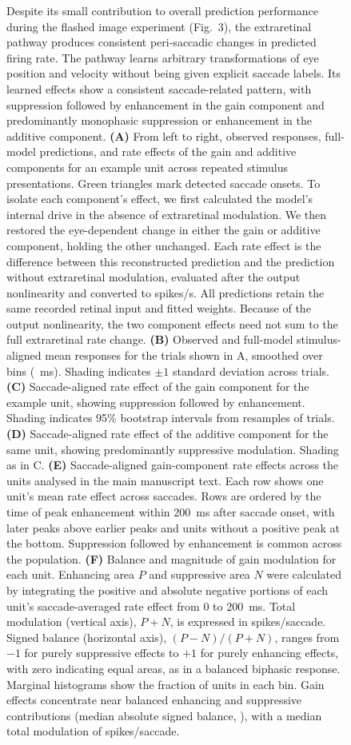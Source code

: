 \documentclass{lite}
\begin{document}
\begin{figure}[p]
  \ContinuedFloat
  \captionsetup{singlelinecheck=false}
  \caption[]{
  Despite its small contribution to overall prediction performance during the flashed image experiment (Fig.~3), the extraretinal pathway produces consistent peri-saccadic changes in predicted firing rate. The pathway learns arbitrary transformations of eye position and velocity without being given explicit saccade labels. Its learned effects show a consistent saccade-related pattern, with suppression followed by enhancement in the gain component and predominantly monophasic suppression or enhancement in the additive component.
  \textbf{(A)} From left to right, observed responses, full-model predictions, and rate effects of the gain and additive components for an example unit across \EDThreeTrials{} repeated stimulus presentations. Green triangles mark detected saccade onsets. To isolate each component's effect, we first calculated the model's internal drive in the absence of extraretinal modulation. We then restored the eye-dependent change in either the gain or additive component, holding the other unchanged. Each rate effect is the difference between this reconstructed prediction and the prediction without extraretinal modulation, evaluated after the output nonlinearity and converted to spikes/s. All predictions retain the same recorded retinal input and fitted weights. Because of the output nonlinearity, the two component effects need not sum to the full extraretinal rate change.
  \textbf{(B)} Observed and full-model stimulus-aligned mean responses for the trials shown in A, smoothed over \EDThreeSmoothingBins{} bins (\EDThreeSmoothingMs{}~ms). Shading indicates $\pm1$ standard deviation across trials.
  \textbf{(C)} Saccade-aligned rate effect of the gain component for the example unit, showing suppression followed by enhancement. Shading indicates 95\% bootstrap intervals from \EDThreeBootstrapDraws{} resamples of trials.
  \textbf{(D)} Saccade-aligned rate effect of the additive component for the same unit, showing predominantly suppressive modulation. Shading as in C.
  \textbf{(E)} Saccade-aligned gain-component rate effects across the \EDThreeUnits{} units analysed in the main manuscript text. Each row shows one unit's mean rate effect across saccades. Rows are ordered by the time of peak enhancement within 200~ms after saccade onset, with later peaks above earlier peaks and units without a positive peak at the bottom. Suppression followed by enhancement is common across the population.
  \textbf{(F)} Balance and magnitude of gain modulation for each unit. Enhancing area $P$ and suppressive area $N$ were calculated by integrating the positive and absolute negative portions of each unit's saccade-averaged rate effect from 0 to 200~ms. Total modulation (vertical axis), $P+N$, is expressed in spikes/saccade. Signed balance (horizontal axis), $(P-N)/(P+N)$, ranges from $-1$ for purely suppressive effects to $+1$ for purely enhancing effects, with zero indicating equal areas, as in a balanced biphasic response. Marginal histograms show the fraction of units in each bin. Gain effects concentrate near balanced enhancing and suppressive contributions (median absolute signed balance, \EDThreeGainBalance{}), with a median total modulation of \EDThreeGainTotal{} spikes/saccade.
}
\end{figure}
\end{document}
